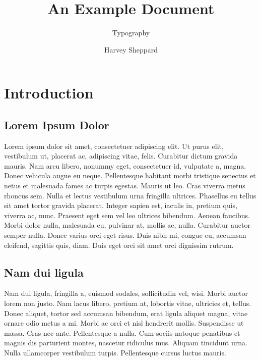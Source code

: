 \documentclass[portable]{yReport}
\author{Harvey Sheppard}
\subtitle{Typography}
\title{An Example Document}
\begin{document}
	
	
	\chapter{Introduction}
	
	\section{Lorem Ipsum Dolor}
	Lorem ipsum dolor sit amet, consectetuer adipiscing elit. Ut purus elit,
	vestibulum ut, placerat ac, adipiscing vitae, felis. Curabitur dictum gravida
	mauris. Nam arcu libero, nonummy eget, consectetuer id, vulputate a, magna.
	Donec vehicula augue eu neque. Pellentesque habitant morbi tristique
	senectus et netus et malesuada fames ac turpis egestas\sideNote[white]{\lipsum[3]}. Mauris ut leo.
	Cras viverra metus rhoncus sem. Nulla et lectus vestibulum urna fringilla
	ultrices. Phasellus eu tellus sit amet tortor gravida placerat. Integer sapien
	est, iaculis in, pretium quis, viverra ac, nunc. Praesent eget sem vel leo ultrices bibendum. Aenean faucibus. Morbi dolor nulla, malesuada eu, pulvinar
	at, mollis ac, nulla. Curabitur auctor semper nulla. Donec varius orci eget
	risus. Duis nibh mi, congue eu, accumsan eleifend, sagittis quis, diam. Duis
	eget orci sit amet orci dignissim rutrum.
	
	\section{Nam dui ligula}
	
	Nam dui ligula, fringilla a, euismod sodales, sollicitudin vel, wisi. Morbi auctor lorem non justo. Nam lacus libero, pretium at, lobortis vitae, ultricies et, tellus. Donec aliquet, tortor sed accumsan bibendum, erat ligula aliquet magna, vitae ornare odio metus a mi. Morbi ac orci et nisl hendrerit mollis. Suspendisse ut massa. Cras nec ante. Pellentesque a nulla. Cum sociis natoque penatibus et magnis dis parturient montes, nascetur ridiculus mus. Aliquam tincidunt urna. Nulla ullamcorper vestibulum turpis. Pellentesque cursus luctus mauris.
	
\end{document}
